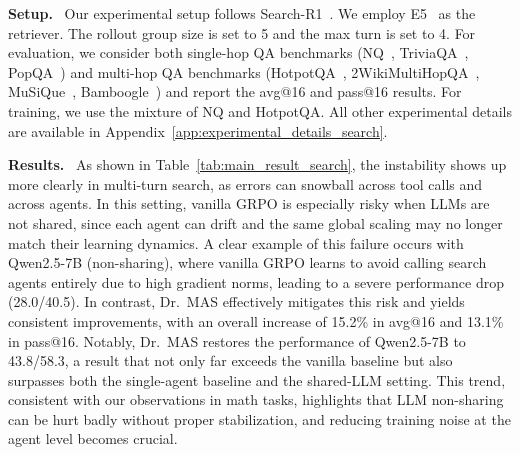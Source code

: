 \documentclass[]{fairmeta}
\theoremstyle{plain}
\theoremstyle{definition}
\theoremstyle{remark}
\newcommand{\methodname}{Dr.\ MAS}
\begin{document}
\textbf{Setup.}~
Our experimental setup follows Search-R1~\citep{jin2025search}. We employ E5~\citep{wang2022text} as the retriever. The rollout group size is set to 5 and the max turn is set to 4. For evaluation, we consider both single-hop QA benchmarks (NQ~\citep{kwiatkowski2019natural}, TriviaQA~\citep{joshi2017triviaqa}, PopQA~\citep{mallen2022not}) and multi-hop QA benchmarks (HotpotQA~\citep{yang2018hotpotqa}, 2WikiMultiHopQA~\citep{ho2020constructing}, MuSiQue~\citep{trivedi2022musique}, Bamboogle~\citep{press2022measuring}) and report the avg@16 and pass@16 results. For training, we use the mixture of NQ and HotpotQA. All other experimental details are available in Appendix~\ref{app:experimental_details_search}.


\textbf{Results.}~
As shown in Table~\ref{tab:main_result_search}, the instability shows up more clearly in multi-turn search, as errors can snowball across tool calls and across agents. In this setting, vanilla GRPO is especially risky when LLMs are not shared, since each agent can drift and the same global scaling may no longer match their learning dynamics. A clear example of this failure occurs with Qwen2.5-7B (non-sharing), where vanilla GRPO learns to avoid calling search agents entirely due to high gradient norms, leading to a severe performance drop (28.0/40.5). In contrast, \methodname{} effectively mitigates this risk and yields consistent improvements, with an overall increase of 15.2\% in avg@16 and 13.1\% in pass@16. Notably, \methodname{} restores the performance of Qwen2.5-7B to 43.8/58.3, a result that not only far exceeds the vanilla baseline but also surpasses both the single-agent baseline and the shared-LLM setting. This trend, consistent with our observations in math tasks, highlights that LLM non-sharing can be hurt badly without proper stabilization, and reducing training noise at the agent level becomes crucial.
\end{document}
